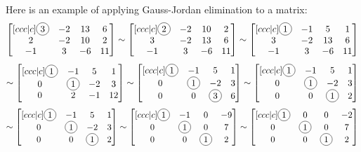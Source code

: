 \begin{applicationActivities}{3}{6}
\begin{observation}
  Here is an example of applying Gauss-Jordan elimination to a matrix:
  \[
    \begin{bmatrix}[ccc|c]
      \circledNumber{3} & -2 & 13 & 6 \\
      2 & -2 & 10 & 2 \\
      -1 & 3 & -6 & 11
    \end{bmatrix}\sim
    \begin{bmatrix}[ccc|c]
     \circledNumber{2} & -2 & 10 & 2 \\
      3 & -2 & 13 & 6 \\
      -1 & 3 & -6 & 11
    \end{bmatrix}\sim
    \begin{bmatrix}[ccc|c]
     \circledNumber{1} & -1 & 5 & 1 \\
      3 & -2 & 13 & 6 \\
      -1 & 3 & -6 & 11
    \end{bmatrix}
  \]
  \[\sim
    \begin{bmatrix}[ccc|c]
     \circledNumber{1} & -1 & 5 & 1 \\
      0 & \circledNumber{1} & -2 & 3 \\
      0 & 2 & -1 & 12
    \end{bmatrix}
    \sim
      \begin{bmatrix}[ccc|c]
       \circledNumber{1} & -1 & 5 & 1 \\
        0 & \circledNumber{1} & -2 & 3 \\
        0 & 0 & \circledNumber{3} & 6
      \end{bmatrix}
    \sim
    \begin{bmatrix}[ccc|c]
     \circledNumber{1} & -1 & 5 & 1 \\
      0 & \circledNumber{1} & -2 & 3 \\
      0 & 0 & \circledNumber{1} & 2
    \end{bmatrix}
  \]
  \[\sim
    \begin{bmatrix}[ccc|c]
     \circledNumber{1} & -1 & 5 & 1 \\
      0 & \circledNumber{1} & -2 & 3 \\
      0 & 0 & \circledNumber{1} & 2
    \end{bmatrix}
    \sim
    \begin{bmatrix}[ccc|c]
     \circledNumber{1} & -1 & 0 & -9 \\
      0 & \circledNumber{1} & 0 & 7 \\
      0 & 0 & \circledNumber{1} & 2
    \end{bmatrix}
    \sim
    \begin{bmatrix}[ccc|c]
     \circledNumber{1} & 0 & 0 & -2 \\
      0 & \circledNumber{1} & 0 & 7 \\
      0 & 0 & \circledNumber{1} & 2
    \end{bmatrix}
  \]
\end{observation}


\end{applicationActivities}

